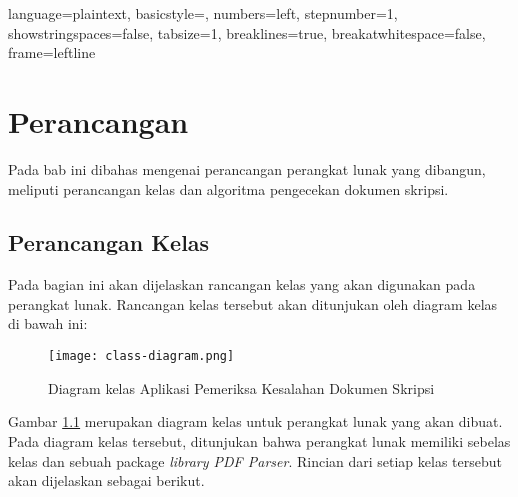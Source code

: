 
\lstset
{ 
    language=plaintext,
    basicstyle=\footnotesize,
    numbers=left,
    stepnumber=1,
    showstringspaces=false,
    tabsize=1,
    breaklines=true,
    breakatwhitespace=false,
    frame=leftline
}

\chapter{Perancangan}
\label{chap:Perancangan}

Pada bab ini dibahas mengenai perancangan perangkat lunak yang dibangun, meliputi perancangan kelas dan algoritma pengecekan dokumen skripsi.

\section{Perancangan Kelas}
Pada bagian ini akan dijelaskan rancangan kelas yang akan digunakan pada perangkat lunak. Rancangan kelas tersebut akan ditunjukan oleh diagram kelas di bawah ini:

\begin{figure}[H]
	\centering	
	\texttt{[image: class-diagram.png]}
	\caption{Diagram kelas Aplikasi Pemeriksa Kesalahan Dokumen Skripsi}	
	\label{fig:diagram_kelas} 
\end{figure}

Gambar \ref{fig:diagram_kelas} merupakan diagram kelas untuk perangkat lunak yang akan dibuat. Pada diagram kelas tersebut, ditunjukan bahwa perangkat lunak memiliki sebelas kelas dan sebuah package \textit{library PDF Parser}. Rincian dari setiap kelas tersebut akan dijelaskan sebagai berikut.

